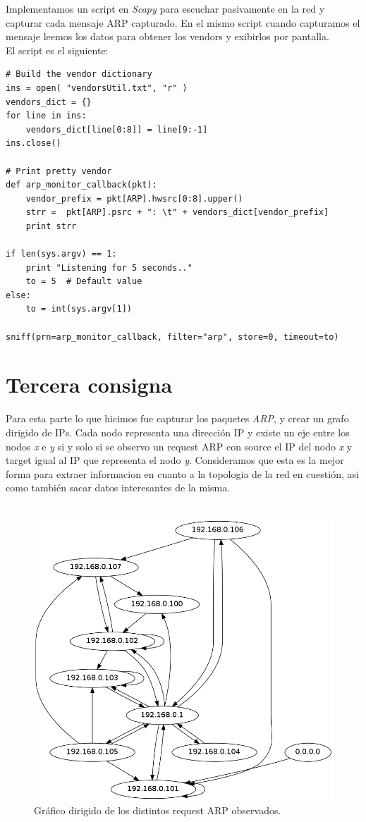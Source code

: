 \documentclass[a4paper]{article}
\begin{document}
Implementamos un script en \textit{Scapy} para escuchar pasivamente en la red y capturar cada mensaje ARP capturado. En el mismo script cuando capturamos el mensaje leemos los datos para obtener los vendors y exibirlos por pantalla.\\

El script es el siguiente:

\begin{verbatim}
# Build the vendor dictionary
ins = open( "vendorsUtil.txt", "r" )
vendors_dict = {}
for line in ins:
    vendors_dict[line[0:8]] = line[9:-1] 
ins.close()

# Print pretty vendor
def arp_monitor_callback(pkt):
	vendor_prefix = pkt[ARP].hwsrc[0:8].upper()
	strr =  pkt[ARP].psrc + ": \t" + vendors_dict[vendor_prefix]
	print strr

if len(sys.argv) == 1:
	print "Listening for 5 seconds.."
	to = 5  # Default value
else:
	to = int(sys.argv[1]) 

sniff(prn=arp_monitor_callback, filter="arp", store=0, timeout=to)
\end{verbatim}

\newpage

\section{Tercera consigna}

Para esta parte lo que hicimos fue capturar los paquetes \textit{ARP}, y crear un grafo dirigido de IPs. Cada nodo representa una dirección IP y existe un eje entre los nodos \textit{x} e \textit{y} si y solo si se observo un request ARP con source el IP del nodo \textit{x} y target igual al IP que representa el nodo \textit{y}. Consideramos que esta es la mejor forma para extraer informacion en cuanto a la topologia de la red en cuestión, asi como también sacar datos interesantes de la misma.\\\\

\begin{figure}[H]
  \centering
  \includegraphics[scale=0.30]{graficos/arpGraph.png}
  \caption{Gráfico dirigido de los distintos request ARP observados.}
\end{figure}

 
\end{document}
